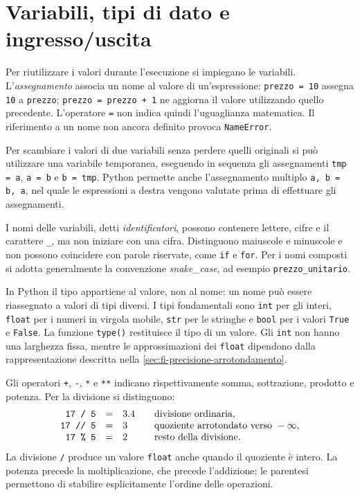 \section{Variabili, tipi di dato e ingresso/uscita}
\label{sec:fi-python-variabili}

Per riutilizzare i valori durante l'esecuzione si impiegano le variabili.
L'\emph{assegnamento} associa un nome al valore di un'espressione:
\texttt{prezzo = 10} assegna \texttt{10} a \texttt{prezzo};
\texttt{prezzo = prezzo + 1} ne aggiorna il valore utilizzando quello
precedente. L'operatore \texttt{=} non indica quindi l'uguaglianza
matematica. Il riferimento a un nome non ancora definito provoca
\texttt{NameError}.

Per scambiare i valori di due variabili senza perdere quelli originali
si può utilizzare una variabile temporanea, eseguendo in sequenza
gli assegnamenti \texttt{tmp = a}, \texttt{a = b} e \texttt{b = tmp}.
Python permette anche l'assegnamento
multiplo \texttt{a, b = b, a}, nel quale le espressioni a destra vengono
valutate prima di effettuare gli assegnamenti.

I nomi delle variabili, detti \emph{identificatori}, possono contenere
lettere, cifre e il carattere \texttt{\_}, ma non iniziare con una cifra.
Distinguono maiuscole e minuscole e non possono coincidere con parole
riservate, come \texttt{if} e \texttt{for}. Per i nomi composti si adotta
generalmente la convenzione \emph{snake\_case}, ad esempio
\texttt{prezzo\_unitario}.

In Python il tipo appartiene al valore, non al nome: un nome può essere
riassegnato a valori di tipi diversi. I tipi fondamentali sono
\texttt{int} per gli interi, \texttt{float} per i numeri in virgola mobile,
\texttt{str} per le stringhe e \texttt{bool} per i valori
\texttt{True} e \texttt{False}. La funzione \texttt{type()} restituisce
il tipo di un valore. Gli \texttt{int} non hanno una larghezza fissa,
mentre le approssimazioni dei \texttt{float} dipendono dalla
rappresentazione descritta nella
\cref{sec:fi-precisione-arrotondamento}.

Gli operatori \texttt{+}, \texttt{-}, \texttt{*} e \texttt{**} indicano
rispettivamente somma, sottrazione, prodotto e potenza. Per la divisione
si distinguono:
\[
\begin{array}{rcl@{\qquad}l}
  \texttt{17 / 5}  &=& 3.4 & \text{divisione ordinaria},\\
  \texttt{17 // 5} &=& 3 & \text{quoziente arrotondato verso }-\infty,\\
  \texttt{17 \% 5}  &=& 2 & \text{resto della divisione}.
\end{array}
\]
La divisione \texttt{/} produce un valore \texttt{float} anche quando il
quoziente è intero. La potenza precede la moltiplicazione, che precede
l'addizione; le parentesi permettono di stabilire esplicitamente l'ordine
delle operazioni.

